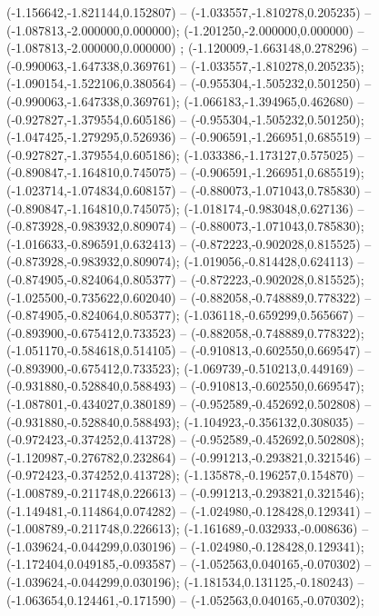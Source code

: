  (-1.156642,-1.821144,0.152807) -- (-1.033557,-1.810278,0.205235) -- (-1.087813,-2.000000,0.000000);
 (-1.201250,-2.000000,0.000000) -- (-1.087813,-2.000000,0.000000) ;
 (-1.120009,-1.663148,0.278296) -- (-0.990063,-1.647338,0.369761) -- (-1.033557,-1.810278,0.205235);
 (-1.090154,-1.522106,0.380564) -- (-0.955304,-1.505232,0.501250) -- (-0.990063,-1.647338,0.369761);
 (-1.066183,-1.394965,0.462680) -- (-0.927827,-1.379554,0.605186) -- (-0.955304,-1.505232,0.501250);
 (-1.047425,-1.279295,0.526936) -- (-0.906591,-1.266951,0.685519) -- (-0.927827,-1.379554,0.605186);
 (-1.033386,-1.173127,0.575025) -- (-0.890847,-1.164810,0.745075) -- (-0.906591,-1.266951,0.685519);
 (-1.023714,-1.074834,0.608157) -- (-0.880073,-1.071043,0.785830) -- (-0.890847,-1.164810,0.745075);
 (-1.018174,-0.983048,0.627136) -- (-0.873928,-0.983932,0.809074) -- (-0.880073,-1.071043,0.785830);
 (-1.016633,-0.896591,0.632413) -- (-0.872223,-0.902028,0.815525) -- (-0.873928,-0.983932,0.809074);
 (-1.019056,-0.814428,0.624113) -- (-0.874905,-0.824064,0.805377) -- (-0.872223,-0.902028,0.815525);
 (-1.025500,-0.735622,0.602040) -- (-0.882058,-0.748889,0.778322) -- (-0.874905,-0.824064,0.805377);
 (-1.036118,-0.659299,0.565667) -- (-0.893900,-0.675412,0.733523) -- (-0.882058,-0.748889,0.778322);
 (-1.051170,-0.584618,0.514105) -- (-0.910813,-0.602550,0.669547) -- (-0.893900,-0.675412,0.733523);
 (-1.069739,-0.510213,0.449169) -- (-0.931880,-0.528840,0.588493) -- (-0.910813,-0.602550,0.669547);
 (-1.087801,-0.434027,0.380189) -- (-0.952589,-0.452692,0.502808) -- (-0.931880,-0.528840,0.588493);
 (-1.104923,-0.356132,0.308035) -- (-0.972423,-0.374252,0.413728) -- (-0.952589,-0.452692,0.502808);
 (-1.120987,-0.276782,0.232864) -- (-0.991213,-0.293821,0.321546) -- (-0.972423,-0.374252,0.413728);
 (-1.135878,-0.196257,0.154870) -- (-1.008789,-0.211748,0.226613) -- (-0.991213,-0.293821,0.321546);
 (-1.149481,-0.114864,0.074282) -- (-1.024980,-0.128428,0.129341) -- (-1.008789,-0.211748,0.226613);
 (-1.161689,-0.032933,-0.008636) -- (-1.039624,-0.044299,0.030196) -- (-1.024980,-0.128428,0.129341);
 (-1.172404,0.049185,-0.093587) -- (-1.052563,0.040165,-0.070302) -- (-1.039624,-0.044299,0.030196);
 (-1.181534,0.131125,-0.180243) -- (-1.063654,0.124461,-0.171590) -- (-1.052563,0.040165,-0.070302);
